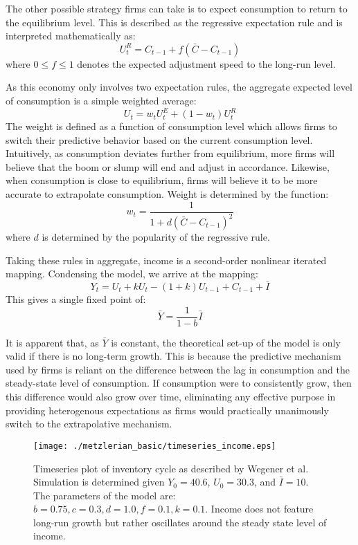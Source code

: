 The other possible strategy firms can take is to expect consumption to return to the equilibrium level. This is described as the regressive expectation rule and is interpreted mathematically as:
\begin{equation}
    U_t^R=C_{t-1}+f(\bar C-C_{t-1})
\end{equation}
where $0\leq f\leq 1$ denotes the expected adjustment speed to the long-run level. 

As this economy only involves two expectation rules, the aggregate expected level of consumption is a simple weighted average:
\begin{equation}
    U_t=w_tU_t^E+(1-w_t)U_t^R
\end{equation}
The weight is defined as a function of consumption level which allows firms to switch their predictive behavior based on the current consumption level. Intuitively, as consumption deviates further from equilibrium, more firms will believe that the boom or slump will end and adjust in accordance. Likewise, when consumption is close to equilibrium, firms will believe it to be more accurate to extrapolate consumption. Weight is determined by the function:
\begin{equation}
    w_t=\frac{1}{1+d(\bar C-C_{t-1})^2}
\end{equation}
where $d$ is determined by the popularity of the regressive rule. 

Taking these rules in aggregate, income is a second-order nonlinear iterated mapping. Condensing the model, we arrive at the mapping:
\begin{equation}
    Y_t=U_t+kU_t-(1+k)U_{t-1}+C_{t-1}+\bar I
\end{equation}
This gives a single fixed point of:
\begin{equation}
    \bar Y=\frac{1}{1-b}\bar I
\end{equation}

It is apparent that, as $\bar Y$ is constant, the theoretical set-up of the model is only valid if there is no long-term growth. This is because the predictive mechanism used by firms is reliant on the difference between the lag in consumption and the steady-state level of consumption. If consumption were to consistently grow, then this difference would also grow over time, eliminating any effective purpose in providing heterogenous expectations as firms would practically unanimously switch to the extrapolative mechanism. 


\begin{figure}
    \centering
    \texttt{[image: ./metzlerian\_basic/timeseries\_income.eps]}
    \caption{Timeseries plot of inventory cycle as described by Wegener et al.\autocite{Wegener2009} Simulation is determined given $Y_0=40.6$, $U_0=30.3$, and $\bar I=10$. The parameters of the model are: $b=0.75,c=0.3,d=1.0,f=0.1,k=0.1$. Income does not feature long-run growth but rather oscillates around the steady state level of income.}
    \label{metzler_basic_timeseries}
\end{figure}

